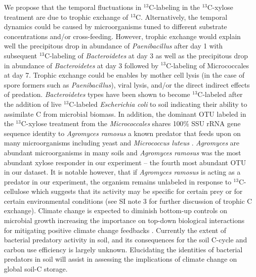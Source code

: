 We propose that the temporal fluctuations in $^{13}$C-labeling in the
$^{13}$C-xylose treatment are due to trophic exchange of $^{13}$C.
Alternatively, the temporal dynamics could be caused by microorganisms tuned to
different substrate concentrations and/or cross-feeding. However, trophic exchange
would explain well the precipitous drop in abundance of
\textit{Paenibacillus} after day 1 with subsequent $^{13}$C-labeling of
\textit{Bacteroidetes} at day 3 as well as the precipitous drop in abundance of
\textit{Bacteroidetes} at day 3 followed by $^{13}$C-labeling of Micrococcales at day 7.
Trophic exchange could be enables by mother cell lysis (in the case of spore formers
such as \textit{Paenibacillus}), viral lysis, and/or the direct indirect effects of
predation. \textit{Bacteroidetes} types have been shown to become
$^{13}$C-labeled after the addition of live $^{13}$C-labeled
\textit{Escherichia coli} to soil \citep{Lueders2006} indicating their ability to
assimilate C from microbial biomass. In addition, the dominant OTU labeled in the $^{13}$C-xylose
treatment from the \textit{Micrococcales} shares 100\% SSU rRNA gene sequence identity
to \textit{Agromyces ramosus} a known predator that
feeds upon on many microorganisms including yeast and \textit{Micrococcus luteus}
\citep{16346402}. \textit{Agromyces} are abundant microorganisms in many soils
and \textit{Agromyces ramosus} was the most abundant xylose responder in our
experiment -- the fourth most abundant OTU in our dataset. It is notable however,
that if \textit{Agromyces ramosus} is acting as a predator in our experiment, the
organism remains unlabeled in response to $^{13}$C-cellulose which suggests that its
activity may be specific for certain prey or for certain environmental
conditions  (see SI note 3 for further discussion of trophic C exchange).
Climate change is expected to diminish bottom-up controls on microbial growth
increasing the importance on top-down biological interactions for mitigating
positive climate change feedbacks \citep{Crowther2015}. Currently the extent
of bacterial predatory activity in soil, and its consequences for the soil C-cycle
and carbon use efficiency is largely unknown. Elucidating the identities of
bacterial predators in soil will assist in assessing the implications of
climate change on global soil-C storage.

